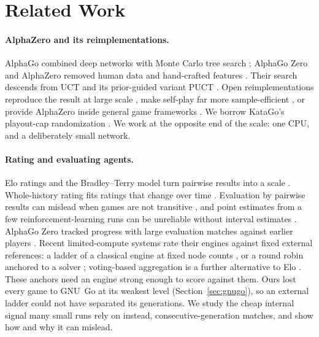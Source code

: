 \section{Related Work}
\paragraph{AlphaZero and its reimplementations.}
AlphaGo combined deep networks with Monte Carlo tree search \citep{silver2016alphago}; AlphaGo Zero and
AlphaZero removed human data and hand-crafted features \citep{silver2017alphagozero,silver2018alphazero}.
Their search descends from UCT and its prior-guided variant PUCT \citep{kocsis2006uct,rosin2011puct}.
Open reimplementations reproduce the result at large scale \citep{tian2019elf}, make self-play far more
sample-efficient \citep{wu2019katago}, or provide AlphaZero inside general game frameworks
\citep{lanctot2019openspiel}. We borrow KataGo's playout-cap randomization \citep{wu2019katago}. We work at
the opposite end of the scale: one CPU, and a deliberately small network.

\paragraph{Rating and evaluating agents.}
Elo ratings and the Bradley--Terry model turn pairwise results into a scale \citep{elo1978rating,bradley1952rank}.
Whole-history rating fits ratings that change over time \citep{coulom2008whr}. Evaluation by pairwise
results can mislead when games are not transitive \citep{balduzzi2018reevaluating,czarnecki2020spinning},
and point estimates from a few reinforcement-learning runs can be unreliable without interval estimates
\citep{agarwal2021precipice}. AlphaGo Zero tracked progress with large evaluation matches against earlier
players \citep{silver2017alphagozero}. Recent limited-compute systems rate their engines against fixed external
references: a ladder of a classical engine at fixed node counts \citep{braun2026efficient}, or a round robin anchored to
a solver \citep{sherwood2026agents}; voting-based aggregation is a further alternative to Elo
\citep{lanctot2023vase}. These anchors need an engine strong enough to score against them. Ours lost every game to
GNU~Go at its weakest level (Section~\ref{sec:gnugo}), so an external ladder could not have separated its generations.
We study the cheap internal signal many small runs rely on instead, consecutive-generation matches, and show how
and why it can mislead.
